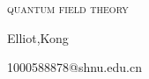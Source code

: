 
\pagestyle{empty}
\begin{center}
    \begin{title}
    \centering
    \vspace*{12cm} 
    {\Huge\scshape \textsc{quantum field theory}\par}
    \vspace{1pt}
    \vspace{2pt}
    \vspace{0.2cm}
    {\Large Elliot,Kong\par}
    \vspace{1pt}
   {\normalsize 1000588878@shnu.edu.cn}    
\end{title}
\end{center}
\clearpage